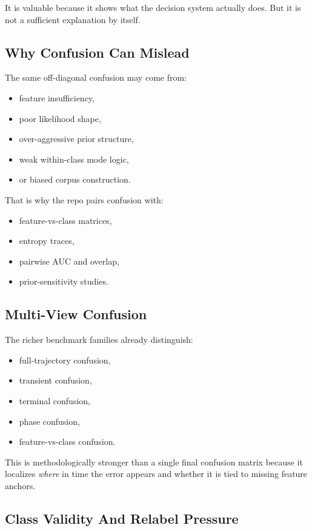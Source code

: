 \documentclass[11pt]{article}
\begin{document}
It is valuable because it shows what the decision system actually does. But it
is not a sufficient explanation by itself.

\subsection{Why Confusion Can Mislead}

The same off-diagonal confusion may come from:
\begin{itemize}[leftmargin=1.5em]
    \item feature insufficiency,
    \item poor likelihood shape,
    \item over-aggressive prior structure,
    \item weak within-class mode logic,
    \item or biased corpus construction.
\end{itemize}

That is why the repo pairs confusion with:
\begin{itemize}[leftmargin=1.5em]
    \item feature-vs-class matrices,
    \item entropy traces,
    \item pairwise AUC and overlap,
    \item prior-sensitivity studies.
\end{itemize}

\subsection{Multi-View Confusion}

The richer benchmark families already distinguish:
\begin{itemize}[leftmargin=1.5em]
    \item full-trajectory confusion,
    \item transient confusion,
    \item terminal confusion,
    \item phase confusion,
    \item feature-vs-class confusion.
\end{itemize}

This is methodologically stronger than a single final confusion matrix because
it localizes \emph{where} in time the error appears and whether it is tied to
missing feature anchors.

\subsection{Class Validity And Relabel Pressure}
\end{document}
